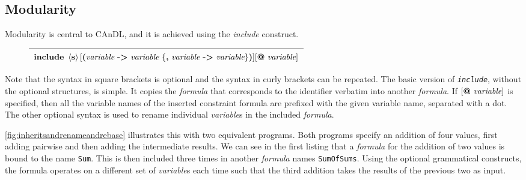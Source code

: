 \subsection{Modularity}

    Modularity is central to CAnDL, and it is achieved using the {\it include}
    construct.
    \begin{figure}[h]
        \centering
        \begin{tabular}{|c|}
            \hline
            $\text{\bf include}\ \left<\text{\bf s}\right>
                                [\text{\bf (}\text{\it variable}\ \text{\bf ->}\ \text{\it variable}\ \{\text{\bf ,}\ \text{\it variable}\ \text{\bf ->}\ \text{\it variable}\}\text{\bf )}]
                                [\text{\bf @}\ \text{\it variable}]$\\
            \hline
        \end{tabular}
    \end{figure}

    \noindent
    Note that the syntax in square brackets is optional and the syntax in curly
    brackets can be repeated.
    The basic version of \texttt{\it include}, without the optional structures,
    is simple.
    It copies the {\it formula} that corresponds to the identifier verbatim into
    another {\it formula}.
    If $[\text{\bf @}\ \text{\it variable}]$ is specified, then all the variable
    names of the inserted constraint formula are prefixed with the given
    variable name, separated with a dot.
    The other optional syntax is used to rename individual {\it variable}s in
    the included {\it formula}.

    \autoref{fig:inheritsandrenameandrebase} illustrates this with two
    equivalent programs.
    Both programs specify an addition of four values, first adding pairwise and
    then adding the intermediate results.
    We can see in the first listing that a {\it formula} for the addition of two
    values is bound to the name {\tt Sum}.
    This is then included three times in another {\it formula} names
    {\tt SumOfSums}.
    Using the optional grammatical constructs, the formula operates on a
    different set of {\it variable}s each time such that the third addition
    takes the results of the previous two as input.

\begin{figure}[ht]

\label{fig:inheritsandrenameandrebase}
\end{figure}

